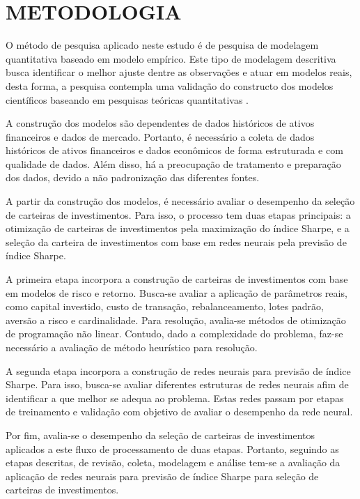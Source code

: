 \section{METODOLOGIA}
    
    \ipar O método de pesquisa aplicado neste estudo é de pesquisa de modelagem quantitativa baseado em modelo empírico. Este tipo de modelagem descritiva busca identificar o melhor ajuste dentre as observações e atuar em modelos reais, desta forma, a pesquisa contempla uma validação do constructo dos modelos científicos baseando em pesquisas teóricas quantitativas \cite{bertrand2002operations}.

    \ipar A construção dos modelos são dependentes de dados históricos de ativos financeiros e dados de mercado. Portanto, é necessário a coleta de dados históricos de ativos financeiros e dados econômicos de forma estruturada e com qualidade de dados. Além disso, há a preocupação de tratamento e preparação dos dados, devido a não padronização das diferentes fontes.

    \ipar A partir da construção dos modelos, é necessário avaliar o desempenho da seleção de carteiras de investimentos. Para isso, o processo tem duas etapas principais: a otimização de carteiras de investimentos pela maximização do índice Sharpe, e a seleção da carteira de investimentos com base em redes neurais pela previsão de índice Sharpe. 

    \ipar A primeira etapa incorpora a construção de carteiras de investimentos com base em modelos de risco e retorno. Busca-se avaliar a  aplicação de parâmetros reais, como capital investido, custo de transação, rebalanceamento, lotes padrão, aversão a risco e cardinalidade. Para resolução, avalia-se métodos de otimização de programação não linear. Contudo, dado a complexidade do problema, faz-se necessário a avaliação de método heurístico para resolução.

    \ipar A segunda etapa incorpora a construção de redes neurais para previsão de índice Sharpe. Para isso, busca-se avaliar diferentes estruturas de redes neurais afim de identificar a que melhor se adequa ao problema. Estas redes passam por etapas de treinamento e validação com objetivo de avaliar o desempenho da rede neural.

    \ipar Por fim, avalia-se o desempenho da seleção de carteiras de investimentos aplicados a este fluxo de processamento de duas etapas. Portanto, seguindo as etapas descritas, de revisão, coleta, modelagem e análise tem-se a avaliação da aplicação de redes neurais para previsão de índice Sharpe para seleção de carteiras de investimentos. 

